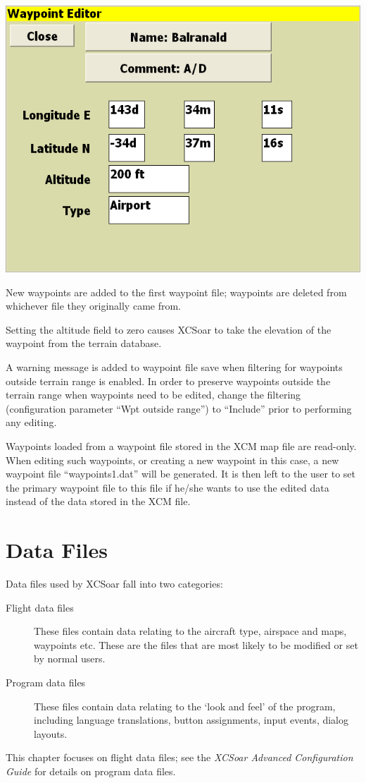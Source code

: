 \documentclass[a4paper,12pt]{refrep}
\begin{document}
\begin{center}
\includegraphics[angle=0,width=\linewidth,keepaspectratio='true']{figures/wayedit-2.png}
\end{center}

New waypoints are added to the first waypoint file; waypoints are
deleted from whichever file they originally came from.

Setting the altitude field to zero causes XCSoar to take the elevation
of the waypoint from the terrain database.

A warning message is added to waypoint file save when filtering for
waypoints outside terrain range is enabled.  In order to preserve
waypoints outside the terrain range when waypoints need to be edited,
change the filtering (configuration parameter ``Wpt outside range'')
to ``Include'' prior to performing any editing.

Waypoints loaded from a waypoint file stored in the XCM map file are
read-only.  When editing such waypoints, or creating a new waypoint in
this case, a new waypoint file ``waypoints1.dat'' will be generated.
It is then left to the user to set the primary waypoint file to this
file if he/she wants to use the edited data instead of the data stored
in the XCM file.

\chapter{Data Files}\label{cha:data-files}

Data files used by XCSoar fall into two categories:
\begin{description}
\item[Flight data files]  These files contain data relating to
the aircraft type, airspace and maps, waypoints etc.  These are the
files that are most likely to be modified or set by normal users.
\item[Program data files]  These files contain data relating to
the `look and feel' of the program, including language translations, 
button assignments, input events, dialog layouts.
\end{description}
This chapter focuses on flight data files; see the {\em XCSoar
Advanced Configuration Guide} for details on program data files.
\end{document}
